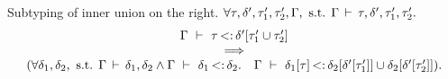 \begin{lemma}{Subtyping of inner union on the right.}%
\label{lem:sub-inner-union-right}
    $\forall \tau, \delta', \tau'_1, \tau'_2, \Gamma, \text{ s.t. }
    \Gamma\,\vdash\,\tau, \delta', \tau'_1, \tau'_2.$
    \[
        \begin{array}{ccc}
        \Gamma\ \vdash\ \tau \operatorname{<:} \delta'[\tau'_1 \cup \tau'_2]\\
        \quad\implies\quad\\
        (\forall \delta_1, \delta_2, \text{ s.t. }
        \Gamma\,\vdash\,\delta_1, \delta_2 \land
        \Gamma\ \vdash\ \delta_1 \operatorname{<:} \delta_2.\quad
        \Gamma\ \vdash\ \delta_1[\tau] \operatorname{<:} \delta_2[\delta'[\tau'_1]] \cup \delta_2[\delta'[\tau'_2]]
            ).
        \end{array}
    \]
\end{lemma}
